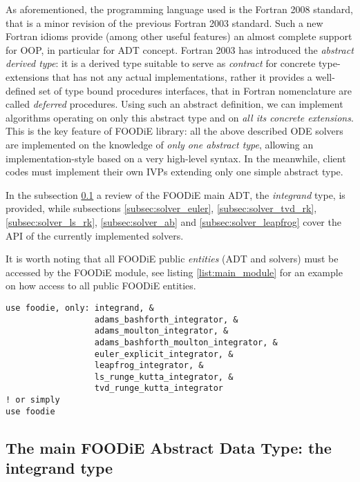 \documentclass[pdftex,preprint,3p,times,numbers]{elsarticle}
\begin{document}
As aforementioned, the programming language used is the Fortran 2008 standard, that is a minor revision of the previous Fortran 2003 standard. Such a new Fortran idioms provide (among other useful features) an almost complete support for OOP, in particular for ADT concept. Fortran 2003 has introduced the \emph{abstract derived type}: it is a derived type suitable to serve as \emph{contract} for concrete type-extensions that has not any actual implementations, rather it provides a well-defined set of type bound procedures interfaces, that in Fortran nomenclature are called \emph{deferred} procedures. Using such an abstract definition, we can implement algorithms operating on only this abstract type and on \emph{all its concrete extensions}. This is the key feature of FOODiE library: all the above described ODE solvers are implemented on the knowledge of \emph{only one abstract type}, allowing an implementation-style based on a very high-level syntax. In the meanwhile, client codes must implement their own IVPs extending only one simple abstract type.

In the subsection \ref{subsec:type_integrand} a review of the FOODiE main ADT, the \emph{integrand} type, is provided, while subsections \ref{subsec:solver_euler}, \ref{subsec:solver_tvd_rk}, \ref{subsec:solver_ls_rk}, \ref{subsec:solver_ab} and \ref{subsec:solver_leapfrog} cover the API of the currently implemented solvers.

It is worth noting that all FOODiE public \emph{entities} (ADT and solvers) must be accessed by the FOODiE module, see listing \ref{list:main_module} for an example on how access to all public FOODiE entities.

\begin{lstlisting}[firstnumber=1,style=code,caption={usage example importing all public entities of FOODiE main module},label={list:main_module}]
use foodie, only: integrand, &
                  adams_bashforth_integrator, &
                  adams_moulton_integrator, &
                  adams_bashforth_moulton_integrator, &
                  euler_explicit_integrator, &
                  leapfrog_integrator, &
                  ls_runge_kutta_integrator, &
                  tvd_runge_kutta_integrator
! or simply
use foodie
\end{lstlisting}

\subsection{The main FOODiE Abstract Data Type: the integrand type}\label{subsec:type_integrand}
\end{document}
